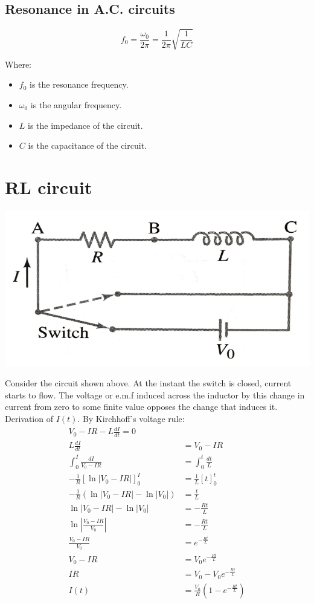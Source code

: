 \documentclass[11pt]{article}
\begin{document}
\subsection{Resonance in A.C. circuits}
\label{sec:org5219c14}
\[f_0 = \frac{\omega_0}{2 \pi} = \frac{1}{2 \pi} \sqrt{\frac{1}{LC}}\]

Where:
\begin{itemize}
\item \(f_0\) is the resonance frequency.
\item \(\omega_0\) is the angular frequency.
\item \(L\) is the impedance of the circuit.
\item \(C\) is the capacitance of the circuit.
\end{itemize}


\section{RL circuit}
\label{sec:org1bbabe5}
\begin{center}
\includegraphics[width=.9\linewidth]{./images/rl-circuit.png}
\end{center}

Consider the circuit shown above. At the instant the switch is closed, current starts to flow. The voltage or e.m.f induced across the inductor by this change in current from zero to some finite value opposes the change that induces it.
\\[0pt]

Derivation of \(I(t)\). By Kirchhoff's voltage rule:
\begin{align*}
V_0 - IR - L \frac{dI}{dt} = 0 \\
L \frac{dI}{dt} &= V_0 - IR \\
\int_0^I \frac{dI}{V_0 - IR} &= \int_0^t \frac{dt}{L} \\
-\frac{1}{R} \left[\ln |V_0 - IR| \right]_0^I &= \frac{1}{L}[t]_0^t \\
-\frac{1}{R} \left(\ln |V_0 - IR| - \ln |V_0| \right) &= \frac{t}{L} \\
\ln |V_0 - IR| - \ln |V_0| &= -\frac{Rt}{L} \\
\ln \left| \frac{V_0 - IR}{V_0} \right| &= -\frac{Rt}{L} \\
\frac{V_0 - IR}{V_0} &= e^{-\frac{Rt}{L}} \\
V_0 - IR &= V_0 e^{-\frac{Rt}{L}} \\
IR &= V_0 - V_0 e^{- \frac{Rt}{L}} \\
I(t) &= \frac{V_0}{R} \left(1 - e^{- \frac{Rt}{L}} \right)
\end{align*}
\end{document}
